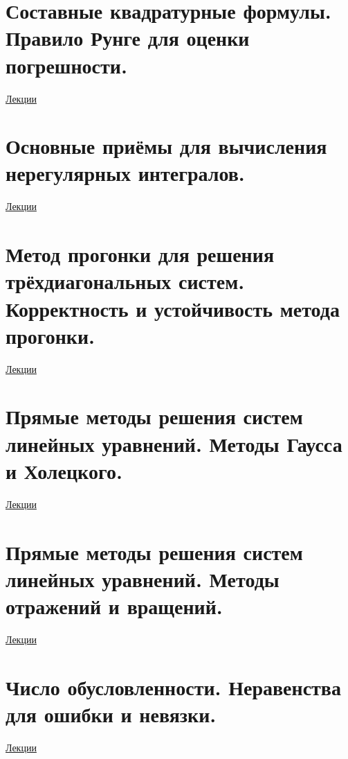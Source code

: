 \documentclass[specialist, subf, href, colorlinks=true, 12pt, times, mtpro, final]{disser}
\theoremstyle{definition}
\begin{document}
\section {Составные квадратурные формулы. Правило Рунге для оценки погрешности.}
	\hyperlink {lects.44}{Лекции}\\

\section {Основные приёмы для вычисления нерегулярных интегралов.}
	\hyperlink {lects.45}{Лекции}\\

\section {Метод прогонки для решения трёхдиагональных систем. Корректность и устойчивость метода прогонки.}
	\hyperlink {lects.48}{Лекции}\\

\section {Прямые методы решения систем линейных уравнений. Методы Гаусса и Холецкого.}
	\hyperlink {lects.51}{Лекции}\\

\section {Прямые методы решения систем линейных уравнений. Методы отражений и вращений.}
	\hyperlink {lects.54}{Лекции}\\

\section {Число обусловленности. Неравенства для ошибки и невязки.}
	\hyperlink {lects.56}{Лекции}\\
\end{document}
